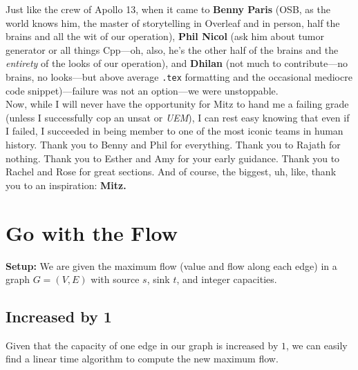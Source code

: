 \documentclass[conference]{styles/acmsiggraph}
\newcommand{\?}{\stackrel{?}{=}}
\begin{document}
Just like the crew of Apollo 13, when it came to \textbf{Benny Paris} (OSB, as the world knows him, the master of storytelling in Overleaf and in person, half the brains and all the wit of our operation), \textbf{Phil Nicol} (ask him about tumor generator or all things Cpp---oh, also, he's the other half of the brains and the \textit{entirety} of the looks of our operation), and \textbf{Dhilan} (not much to contribute---no brains, no looks---but above average \verb|.tex| formatting and the occasional mediocre code snippet)---failure was not an option---we were unstoppable. \\

Now, while I will never have the opportunity for Mitz to hand me a failing grade (unless I successfully cop an unsat or \textit{UEM}), I can rest easy knowing that even if I failed, I succeeded in being member to one of the most iconic teams in human history.  Thank you to Benny and Phil for everything.  Thank you to Rajath for nothing.  Thank you to Esther and Amy for your early guidance.  Thank you to Rachel and Rose for great sections.  And of course, the biggest, uh, like, thank you to an inspiration: \textbf{Mitz.}

\newpage










\section{Go with the Flow}
\textbf{Setup:} We are given the maximum flow (value and flow along each edge) in a graph $G = (V,E)$ with source $s$, sink $t$, and integer capacities.

\subsection{Increased by 1}
Given that the capacity of one edge in our graph is increased by $1$, we can easily find a linear time algorithm to compute the new maximum flow.\\
\end{document}
